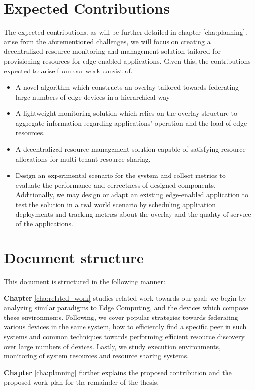 \section{Expected Contributions}

The expected contributions, as will be further detailed in chapter \ref{cha:planning}, arise from the aforementioned challenges, we will focus on creating a decentralized resource monitoring and management solution tailored for provisioning resources for edge-enabled applications. Given this, the contributions expected to arise from our work consist of: 

\begin{itemize}

    \item A novel algorithm which constructs an overlay tailored towards federating large numbers of edge devices in a hierarchical way.
    
    \item A lightweight monitoring solution which relies on the overlay structure to aggregate information regarding applications’ operation and the load of edge resources.
    
    \item A decentralized resource management solution capable of satisfying resource allocations for multi-tenant resource sharing.

    \item Design an experimental scenario for the system and collect metrics to evaluate the performance and correctness of designed components. Additionally, we may design or adapt an existing edge-enabled application to test the solution in a real world scenario by scheduling application deployments and tracking metrics about the overlay and the quality of service of the applications.
    
\end{itemize}

\section{Document structure}

This document is structured in the following manner:

\textbf{Chapter} \ref{cha:related_work} studies related work towards our goal: we begin by analyzing similar paradigms to Edge Computing, and the devices which compose these environments. Following, we cover popular strategies towards federating various devices in the same system, how to efficiently find a specific peer in such systems and common techniques towards performing efficient resource discovery over large numbers of devices. Lastly, we study execution environments, monitoring of system resources and resource sharing systems.

\textbf{Chapter} \ref{cha:planning} further explains the proposed contribution and the proposed work plan for the remainder of the thesis. 
